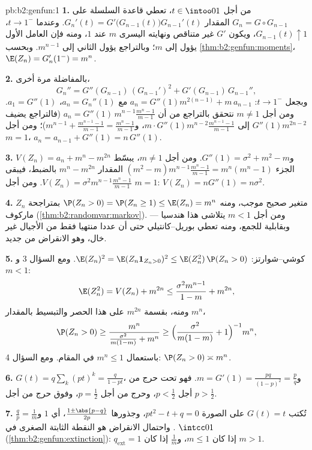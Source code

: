 \begin{solution}{pb:b2:genfun:1}
\textbf{1.} من أجل $t \in \intoo01$، تعطي قاعدة السلسلة على $G_n = G
\circ G_{n-1}$ المقدار
$G_n'(t) =
G'\bigl(G_{n-1}(t)\bigr)G_{n-1}'(t)$. وعندما $t \to 1^-$، $G_{n-1}(t) \uparrow 1$، ويكون $G'$ غير متناقص ونهايته
اليسرى $m$ عند $1$، ومنه فإن العامل الأول يؤول إلى $m$؛
وبالتراجع يؤول الثاني إلى $m^{n-1}$. وبحسب \cref{thm:b2:genfun:moments}، $\E(Z_n) = G_n'(1^-) = m^n$.

\textbf{2.} بالمفاضلة مرة أخرى،
\[
G_n'' = G''(G_{n-1})\,(G_{n-1}')^2 +
G'(G_{n-1})\,G_{n-1}'',
\]
وبجعل $t \to 1^-$: $a_n = G''(1)m^{2(n-1)} + m\,
a_{n-1}$ مع $a_n = G_n''(1)$، $a_1 = G''(1)$. ومن أجل $m \neq
1$ نتحقق
بالتراجع من أن $a_n = G''(1)\,m^{n-1}
\frac{m^n - 1}{m - 1}$ (فالتراجع يضيف $G''(1)m^{2n-2}$ إلى $m\cdot G''(1)m^{n-2}\frac{m^{n-1}-1}{m-1}$، و$m^{n-1} + \frac{m^{n-1}-1}{m-1} = \frac{m^n - 1}{m-1}$)؛
ومن أجل $m = 1$، $a_n = a_{n-1} + G''(1) = n\,G''(1)$.

\textbf{3.} $V(Z_n) = a_n + m^n - m^{2n}$ و$G''(1) =
\sigma^2 + m^2 - m$. ومن أجل $m \neq 1$، يبسّط الجزء $(m^2 -
m)m^{n-1}\frac{m^n-1}{m-1} = m^n(m^n - 1)$
المقدار $m^n -
m^{2n}$ بالضبط، فيبقى $V(Z_n) =
\sigma^2m^{n-1}\frac{m^n-1}{m-1}$. ومن أجل $m = 1$: $V(Z_n) =
nG''(1) = n\sigma^2$.

\textbf{4.} $Z_n$ متغير صحيح موجب، ومنه $\P(Z_n > 0) = \P(Z_n \geq 1) \leq \E(Z_n) = m^n$ بمتراجحة ماركوف
(\cref{thm:b2:randomvar:markov}). ومن أجل $m < 1$ يتلاشى هذا هندسيا --- وبقابلية للجمع، ومنه
تعطي بوريل--كانتيلي حتى أن عددا منتهيا فقط من الأجيال غير خال، وهو
الانقراض من جديد.

\textbf{5.} كوشي--شوارتز: $\E(Z_n)^2 = \E(Z_n\mathbf
1_{Z_n>0})^2 \leq \E(Z_n^2)\,\P(Z_n > 0)$. ومع السؤال 3 و$m < 1$:
\[
\E(Z_n^2) = V(Z_n) + m^{2n}
\leq \frac{\sigma^2m^{n-1}}{1-m} + m^{2n},
\]
ومنه، بقسمة $m^{2n}$ على هذا الحصر والتبسيط بالمقدار $m^n$،
\[
\P(Z_n > 0) \geq \frac{m^n}{\frac{\sigma^2}{m(1-m)} + m^n}
\geq \Bigl(\frac{\sigma^2}{m(1-m)} + 1\Bigr)^{-1}m^n ,
\]
باستعمال $m^n \leq 1$ في المقام. ومع السؤال 4: $\P(Z_n > 0) \asymp m^n$.

\textbf{6.} $G(t) = q\sum_k(pt)^k = \frac{q}{1 - pt}$، و$m
= G'(1) = \frac{pq}{(1-p)^2} = \frac pq$. فهو تحت حرج من أجل $p
< \frac12$، وحرج من
أجل $p = \frac12$، وفوق حرج من أجل $p
> \frac12$.

\textbf{7.} تُكتب $G(t) = t$ على الصورة $pt^2 - t + q = 0$، وجذورها $\frac{1 \pm \abs{p - q}}{2p}$، أي
$1$ و$\frac qp =
\frac1m$. واحتمال الانقراض هو النقطة الثابتة الصغرى في $\intcc01$
(\cref{thm:b2:genfun:extinction}): $q_{\mathrm{ext}} = 1$ إذا كان $m \leq 1$، و$\frac1m$ إذا كان $m >
1$.


\end{solution}
